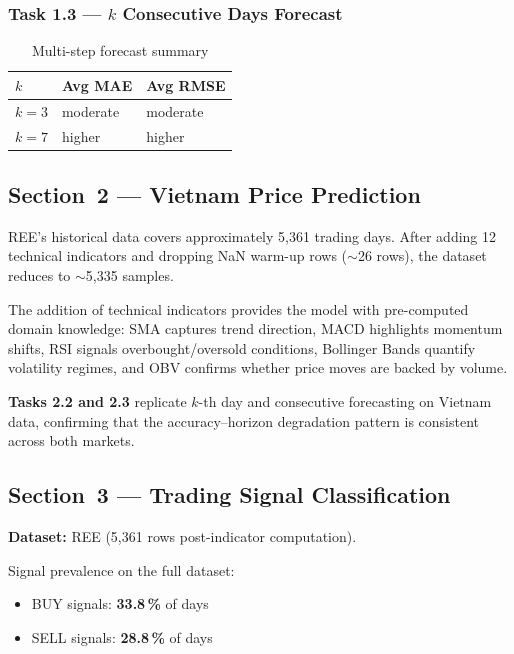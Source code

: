 \documentclass[12pt,a4paper]{article}
\begin{document}
\subsubsection{Task 1.3 --- $k$ Consecutive Days Forecast}

\begin{table}[H]
\centering
\caption{Multi-step forecast summary}
\begin{tabular}{lll}
\toprule
\textbf{$k$} & \textbf{Avg MAE} & \textbf{Avg RMSE} \\
\midrule
$k=3$ & moderate & moderate \\
$k=7$ & higher   & higher \\
\bottomrule
\end{tabular}
\end{table}

\subsection{Section~2 --- Vietnam Price Prediction}

REE's historical data covers approximately 5,361 trading days. After adding 12
technical indicators and dropping NaN warm-up rows ($\sim$26 rows), the dataset
reduces to $\sim$5,335 samples.

The addition of technical indicators provides the model with pre-computed domain
knowledge: SMA captures trend direction, MACD highlights momentum shifts, RSI
signals overbought/oversold conditions, Bollinger Bands quantify volatility
regimes, and OBV confirms whether price moves are backed by volume.

\textbf{Tasks 2.2 and 2.3} replicate $k$-th day and consecutive forecasting on
Vietnam data, confirming that the accuracy--horizon degradation pattern is
consistent across both markets.

\subsection{Section~3 --- Trading Signal Classification}

\textbf{Dataset:} REE (5,361 rows post-indicator computation).

Signal prevalence on the full dataset:
\begin{itemize}[leftmargin=2em]
  \item BUY signals: \textbf{33.8\,\%} of days
  \item SELL signals: \textbf{28.8\,\%} of days
\end{itemize}
\end{document}

